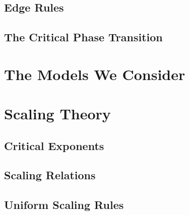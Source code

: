 \documentclass[twoside,10pt]{article}
\begin{document}
\subsection{Edge Rules}

\lipsum[4-5]

\subsection{The Critical Phase Transition}

\lipsum[6-8]

\section{The Models We Consider}

\lipsum[9-15]

\section{Scaling Theory}

\lipsum[16]

\subsection{Critical Exponents}

\lipsum[17-19]

\subsection{Scaling Relations}

\lipsum[20-21]

\subsection{Uniform Scaling Rules}
\end{document}
